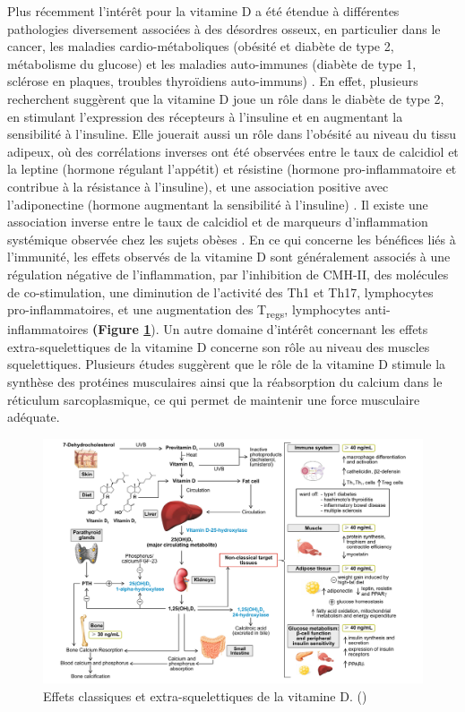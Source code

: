 \documentclass[
  a4paper,
  DIV=11,
  numbers=noendperiod,
  listof=totoc]{scrreprt}
\begin{document}
Plus récemment l'intérêt pour la vitamine D a été étendue à différentes
pathologies diversement associées à des désordres osseux, en particulier
dans le cancer, les maladies cardio-métaboliques (obésité et diabète de
type 2, métabolisme du glucose) et les maladies auto-immunes (diabète de
type 1, sclérose en plaques, troubles thyroïdiens auto-immuns)
\autocite{Dankers.2017,Caprio.2017}. En effet, plusieurs recherchent
suggèrent que la vitamine D joue un rôle dans le diabète de type 2, en
stimulant l'expression des récepteurs à l'insuline et en augmentant la
sensibilité à l'insuline. Elle jouerait aussi un rôle dans l'obésité au
niveau du tissu adipeux, où des corrélations inverses ont été observées
entre le taux de calcidiol et la leptine (hormone régulant l'appétit) et
résistine (hormone pro-inflammatoire et contribue à la résistance à
l'insuline), et une association positive avec l'adiponectine (hormone
augmentant la sensibilité à l'insuline)
\autocite{Caprio.2017,Bellia.2013}. Il existe une association inverse
entre le taux de calcidiol et de marqueurs d'inflammation systémique
observée chez les sujets obèses \autocite{Bellia.2013}. En ce qui
concerne les bénéfices liés à l'immunité, les effets observés de la
vitamine D sont généralement associés à une régulation négative de
l'inflammation, par l'inhibition de \ac{CMH-II}, des molécules de
co-stimulation, une diminution de l'activité des Th1 et Th17,
lymphocytes pro-inflammatoires, et une augmentation des
T\textsubscript{regs}, lymphocytes anti-inflammatoires \textbf{(Figure
\ref{fig:extra-skeletal}}). Un autre domaine d'intérêt concernant les
effets extra-squelettiques de la vitamine D concerne son rôle au niveau
des muscles squelettiques. Plusieurs études suggèrent que le rôle de la
vitamine D stimule la synthèse des protéines musculaires ainsi que la
réabsorption du calcium dans le réticulum sarcoplasmique, ce qui permet
de maintenir une force musculaire adéquate.

\begin{landscape}
\begin{figure}
\includegraphics{figures/extra-skeletal-effect.png} 
\caption[\textbf{Effets classiques et extra-squelettiques de la vitamine D.}]
{Effets classiques et extra-squelettiques de la vitamine D. (\cite{Caprio.2017})}
\label{fig:extra-skeletal}
\end{figure}
\end{landscape}
\end{document}
